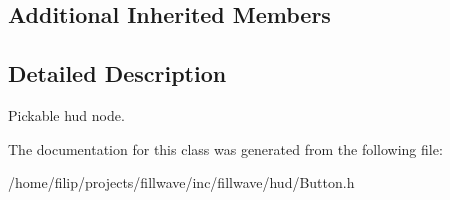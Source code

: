 \subsection*{Additional Inherited Members}


\subsection{Detailed Description}
Pickable hud node. 

The documentation for this class was generated from the following file\+:\begin{DoxyCompactItemize}
\item 
/home/filip/projects/fillwave/inc/fillwave/hud/Button.\+h\end{DoxyCompactItemize}
